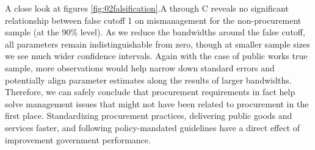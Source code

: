 \documentclass[11pt]{article}
\begin{document}
A close look at figures \ref{fig:02falsification}.A through C reveals  no significant relationship between false cutoff 1 on mismanagement for the non-procurement sample (at the 90\% level). As we reduce the bandwidths around the false cutoff, all parameters remain indistinguishable from zero, though at smaller sample sizes we see much wider confidence intervals. Again with the case of public works true sample, more observations would help narrow down standard errors and potentially align parameter estimates along the results of larger bandwidths. Therefore, we can safely conclude that procurement requirements in fact help solve management issues that might not have been related to procurement in the first place. Standardizing procurement practices, delivering public goods and services faster, and following policy-mandated guidelines have a direct effect of improvement government performance.
\clearpage
\end{document}

